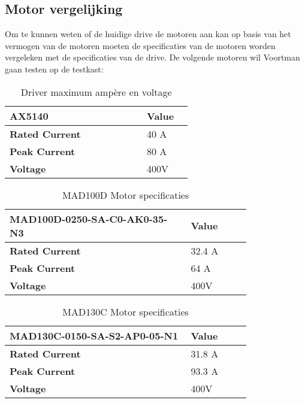 \newpage

\subsection{Motor vergelijking}

Om te kunnen weten of de huidige drive de motoren aan kan op basis van het vermogen van de motoren moeten de specificaties van de motoren worden vergeleken met de specificaties van de drive. De volgende motoren wil Voortman gaan testen op de testkast:

\begin{table}[H]
	\caption{Driver maximum ampère en voltage}
	\label{tab:AX5140Max}
	\centering
	\begin{tabular}{|p{0.6\linewidth}|p{0.2\linewidth}|}
		\hline
		\textbf{AX5140} & \textbf{Value} \\
		\hline
		\textbf{Rated Current} & 40 \gls{A} \\
		\textbf{Peak Current} & 80 \gls{A} \\
		\textbf{Voltage} & 400\gls{V} \\
		\hline
	\end{tabular}
\end{table}

\begin{table}[H]
	\caption{MAD100D Motor specificaties}
	\label{tab:MAD100D}
	\centering
	\begin{tabular}{|p{0.6\linewidth}|p{0.2\linewidth}|}
		\hline
		\textbf{MAD100D-0250-SA-C0-AK0-35-N3} & \textbf{Value} \\
		\hline
		\textbf{Rated Current} & 32.4 \gls{A} \\
		\textbf{Peak Current} & 64 \gls{A} \\
		\textbf{Voltage} & 400\gls{V} \\
		\hline
	\end{tabular}
\end{table}

\begin{table}[H]
	\caption{MAD130C Motor specificaties}
	\label{tab:MAD130C}
	\centering
	\begin{tabular}{|p{0.6\linewidth}|p{0.2\linewidth}|}
		\hline
		\textbf{MAD130C-0150-SA-S2-AP0-05-N1} & \textbf{Value} \\
		\hline
		\textbf{Rated Current} & 31.8 \gls{A} \\
		\textbf{Peak Current} & 93.3 \gls{A} \\
		\textbf{Voltage} & 400\gls{V} \\
		\hline
	\end{tabular}
\end{table}

